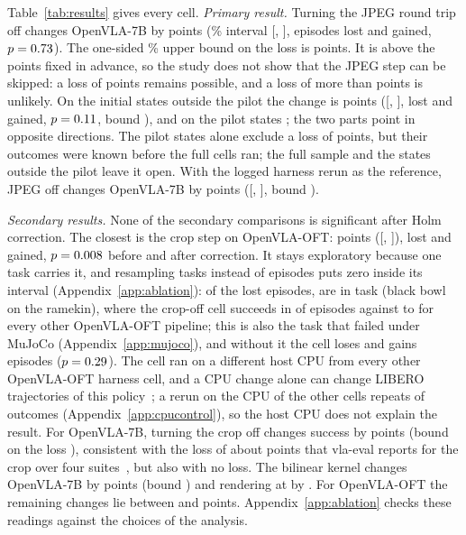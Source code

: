 Table~\ref{tab:results} gives every cell. \emph{Primary result.} Turning the JPEG round trip off changes OpenVLA-7B by \SevJpegDiff{} points (\AlphaPct\% interval [\SevJpegLo, \SevJpegHi], \SevJpegLost{} episodes lost and \SevJpegGained{} gained, $p = 0.73$). The one-sided \AlphaPct\% upper bound on the loss is \SevJpegUB{} points. It is above the \ThresholdPts{} points fixed in advance, so the study does not show that the JPEG step can be skipped: a loss of \ThresholdPts{} points remains possible, and a loss of more than \SevJpegUB{} points is unlikely. On the \OutPairs{} initial states outside the pilot the change is \OutDiff{} points ([\OutLo, \OutHi], \OutLost{} lost and \OutGained{} gained, $p = 0.11$, bound \OutUB), and on the \PilotPairs{} pilot states \AblFirstDiff; the two parts point in opposite directions. The pilot states alone exclude a loss of \ThresholdPts{} points, but their outcomes were known before the full cells ran; the full sample and the states outside the pilot leave it open. With the logged harness rerun as the reference, JPEG off changes OpenVLA-7B by \VrJpegDiff{} points ([\VrJpegLo, \VrJpegHi], bound \VrJpegUB).

\emph{Secondary results.} None of the \NSecondary{} secondary comparisons is significant after Holm correction. The closest is the crop step on OpenVLA-OFT: \OftCropDiff{} points ([\OftCropLo, \OftCropHi]), \OftCropLost{} lost and \OftCropGained{} gained, $p = 0.008$ before and \OftCropHolm{} after correction. It stays exploratory because one task carries it, and resampling tasks instead of episodes puts zero inside its interval (Appendix~\ref{app:ablation}): of the \OftCropLost{} lost episodes, \OftCropTaskFiveLost{} are in task \TaskFive{} (black bowl on the ramekin), where the crop-off cell succeeds in \OftTaskFiveCrop{} of \NStates{} episodes against \OftTaskFiveOthersMin{} to \OftTaskFiveOthersMax{} for every other OpenVLA-OFT pipeline; this is also the task that failed under MuJoCo \MujocoNewVersion{} (Appendix~\ref{app:mujoco}), and without it the cell loses \OftCropNoFiveLost{} and gains \OftCropNoFiveGained{} episodes ($p = 0.29$). The cell ran on a different host CPU from every other OpenVLA-OFT harness cell, and a CPU change alone can change LIBERO trajectories of this policy~\citep{jiang2026bench}; a rerun on the CPU of the other cells repeats \CpuCtrlSame{} of \NPairs{} outcomes (Appendix~\ref{app:cpucontrol}), so the host CPU does not explain the result.
For OpenVLA-7B, turning the crop off changes success by \SevCropDiff{} points (bound on the loss \SevCropUB), consistent with the loss of about \ExtVeCropPts{} points that vla-eval reports for the crop over four suites~\citep{vlaeval}, but also with no loss. The bilinear kernel changes OpenVLA-7B by \SevBilDiff{} points (bound \SevBilUB) and rendering at \InputRes{} by \SevRendDiff. For OpenVLA-OFT the remaining changes lie between \OftJpegDiff{} and \OftBilDiff{} points. Appendix~\ref{app:ablation} checks these readings against the choices of the analysis.

